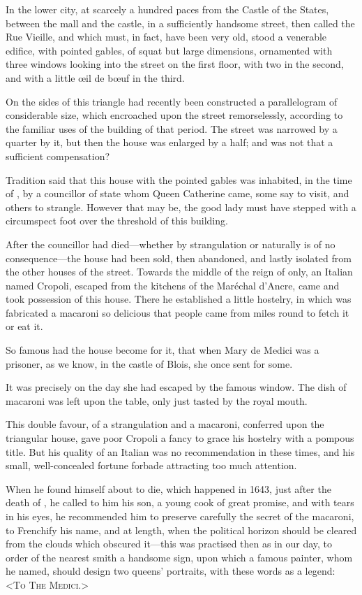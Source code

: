 In the lower city, at scarcely a hundred paces from the Castle of the States, between the mall and the castle, in a sufficiently handsome street, then called the Rue Vieille, and which must, in fact, have been very old, stood a venerable edifice, with pointed gables, of squat but large dimensions, ornamented with three windows looking into the street on the first floor, with two in the second, and with a little œil de bœuf in the third.

On the sides of this triangle had recently been constructed a parallelogram of considerable size, which encroached upon the street remorselessly, according to the familiar uses of the building of that period. The street was narrowed by a quarter by it, but then the house was enlarged by a half; and was not that a sufficient compensation?

Tradition said that this house with the pointed gables was inhabited, in the time of , by a councillor of state whom Queen Catherine came, some say to visit, and others to strangle. However that may be, the good lady must have stepped with a circumspect foot over the threshold of this building.

After the councillor had died—whether by strangulation or naturally is of no consequence—the house had been sold, then abandoned, and lastly isolated from the other houses of the street. Towards the middle of the reign of  only, an Italian named Cropoli, escaped from the kitchens of the Maréchal d'Ancre, came and took possession of this house. There he established a little hostelry, in which was fabricated a macaroni so delicious that people came from miles round to fetch it or eat it.

So famous had the house become for it, that when Mary de Medici was a prisoner, as we know, in the castle of Blois, she once sent for some.

It was precisely on the day she had escaped by the famous window. The dish of macaroni was left upon the table, only just tasted by the royal mouth.

This double favour, of a strangulation and a macaroni, conferred upon the triangular house, gave poor Cropoli a fancy to grace his hostelry with a pompous title. But his quality of an Italian was no recommendation in these times, and his small, well-concealed fortune forbade attracting too much attention.

When he found himself about to die, which happened in 1643, just after the death of , he called to him his son, a young cook of great promise, and with tears in his eyes, he recommended him to preserve carefully the secret of the macaroni, to Frenchify his name, and at length, when the political horizon should be cleared from the clouds which obscured it—this was practised then as in our day, to order of the nearest smith a handsome sign, upon which a famous painter, whom he named, should design two queens' portraits, with these words as a legend: <\textsc{To The Medici.}>

